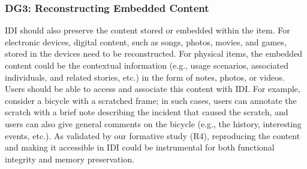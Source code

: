 



\subsubsection{\textbf{DG3: Reconstructing Embedded Content}}
IDI should also preserve the content stored or embedded within the item.
For electronic devices, digital content, such as songs, photos, movies, and games, stored in the devices need to be reconstructed. 
For physical items, the embedded content could be the contextual information (e.g., usage scenarios, associated individuals, and related stories, etc.) in the form of notes, photos, or videos.
Users should be able to access and associate this content with IDI.
For example, consider a bicycle with a scratched frame; in such cases, users can annotate the scratch with a brief note describing the incident that caused the scratch, and users can also give general comments on the bicycle (e.g., the history, interesting events, etc.). 
As validated by our formative study (R4), reproducing the content and making it accessible in IDI could be instrumental for both functional integrity and memory preservation. 




